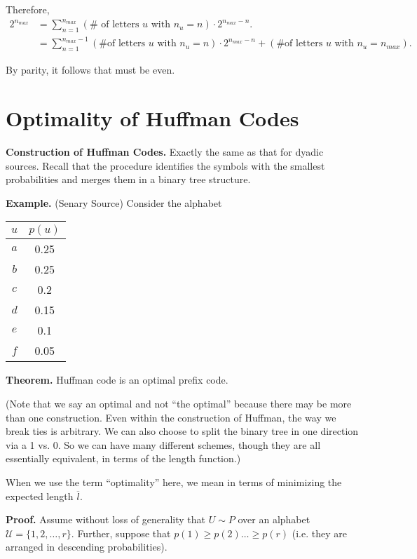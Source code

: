 \documentclass[12pt]{extarticle}
\newcommand{\UU}{\mathcal{U}}
\def\UU{\mathcal{U}}
\begin{document}
Therefore,
\begin{align*}
  2^{n_{max}} &= \sum_{n=1}^{n_{max}} (\text{# of letters $u$ with $n_u = n$}) \cdot 2^{n_{max} - n}. \\
  &= \sum_{n=1}^{n_{max}-1} (\text{\# of letters $u$ with $n_u = n$}) \cdot 2^{n_{max} - n} + (\text{\# of letters $u$ with $n_u = n_{max}$}).
\end{align*}

By parity, it follows that  must be even.



\section{Optimality of Huffman Codes}
{\bf Construction of Huffman Codes.}  Exactly the same as that for dyadic sources.  Recall that the procedure identifies the symbols with the smallest probabilities and merges them in a binary tree structure.

{\bf Example.} (Senary Source) Consider the alphabet


\begin{center}
\begin{tabular}{c|c}
  $u$ & $p(u)$ \\ \hline
  $a$ & 0.25 \\
  $b$ & 0.25 \\
  $c$ & 0.2 \\
  $d$ & 0.15 \\
  $e$ & 0.1 \\
  $f$ & 0.05 
\end{tabular}
\end{center}

{\bf Theorem.} Huffman code is an optimal prefix code.

(Note that we say an optimal and not ``the optimal'' because there may be more than one construction.  Even within the construction of Huffman, the way we break ties is arbitrary.  We can also choose to split the binary tree in one direction via a 1 vs. 0.  So we can have many different schemes, though they are all essentially equivalent, in terms of the length function.)

\def\l{\overline{l}}

When we use the term ``optimality'' here, we mean in terms of minimizing the expected length $\l$.

{\bf Proof.} Assume without loss of generality that $U \sim P$ over an alphabet $\UU = \{ 1, 2, \dots, r \}$.  Further, suppose that $p(1) \geq p(2) \dots \geq p(r)$ (i.e. they are arranged in descending probabilities).
\end{document}
